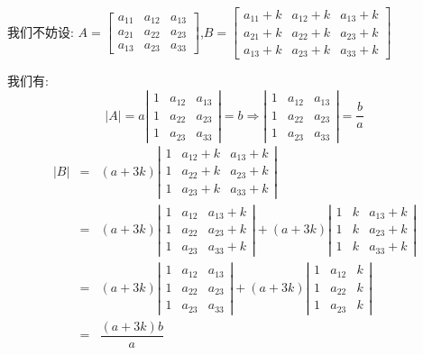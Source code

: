 \begin{solution}
	
	我们不妨设: $A=\left[\begin{matrix}
		a_{11}&a_{12}&a_{13}\\a_{21}&a_{22}&a_{23}\\a_{13}&a_{23}&a_{33}
	\end{matrix} \right] $,$B=\left[\begin{matrix}
		a_{11}+k&a_{12}+k&a_{13}+k\\a_{21}+k&a_{22}+k&a_{23}+k\\a_{13}+k&a_{23}+k&a_{33}+k
	\end{matrix} \right] $
	
	我们有: 
	$$|A|=a\left|\begin{matrix}
		1&a_{12}&a_{13}\\1&a_{22}&a_{23}\\1&a_{23}&a_{33}\end{matrix} \right|=b\Rightarrow \left| \begin{matrix}1&a_{12}&a_{13}\\1&a_{22}&a_{23}\\1&a_{23}&a_{33}\end{matrix}\right|=\dfrac{b}{a}$$
	\begin{eqnarray*}
		|B|&=&(a+3k)\left|\begin{matrix} 1&a_{12}+k&a_{13}+k\\1&a_{22}+k&a_{23}+k\\1&a_{23}+k&a_{33}+k\end{matrix} \right|\\
		&=&(a+3k)\left|\begin{matrix} 1&a_{12}&a_{13}+k\\1&a_{22}&a_{23}+k\\1&a_{23}&a_{33}+k\end{matrix} \right|+(a+3k)\left|\begin{matrix} 1&k&a_{13}+k\\1&k&a_{23}+k\\1&k&a_{33}+k\end{matrix}\right|\\
		&=&(a+3k)\left|\begin{matrix} 1&a_{12}&a_{13}\\1&a_{22}&a_{23}\\1&a_{23}&a_{33}\end{matrix}\right|+(a+3k)\left|\begin{matrix} 1&a_{12}&k\\1&a_{22}&k\\1&a_{23}&k\end{matrix}\right|\\
		&=&\dfrac{(a+3k)b}{a}
	\end{eqnarray*}
\end{solution}

